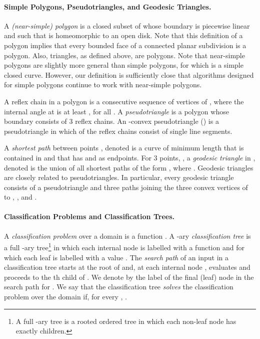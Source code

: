 \documentclass[lotsofwhite]{patmorin}
\begin{document}
\paragraph{Simple Polygons, Pseudotriangles, and Geodesic Triangles.}

A \emph{(near-simple) polygon}  is a closed subset of  whose
boundary is piecewise linear and such that  is
homeomorphic to an open disk.  Note that this definition of a polygon
implies that every bounded face of a connected planar subdivision is a
polygon.  Also, triangles, as defined above, are polygons.  Note that
near-simple polygons are slightly more general than simple polygons,
for which  is a simple closed curve.  However, our
definition is sufficiently close that algorithms designed for simple
polygons continue to work with near-simple polygons.

A reflex chain in a polygon  is a consecutive sequence of vertices
 of , where the internal angle at  is at least
, for all . A \emph{pseudotriangle} is a
polygon whose boundary consists of 3 reflex chains.  An -convex
pseudotriangle () is a pseudotriangle in which  of
the reflex chains consist of single line segments.

A \emph{shortest path} between points , denoted
 is a curve of minimum length that is contained in
 and that has  and  as endpoints.  For 3 points, , a \emph{geodesic triangle} in , denoted  is
the union of all shortest paths of the form , where
.  Geodesic triangles are closely related to
pseudotriangles.  In particular, every geodesic triangle  consists
of a pseudotriangle  and three paths joining the three convex
vertices of  to , , and .

\paragraph{Classification Problems and Classification Trees.}

A \emph{classification problem} over a domain  is a
function .  A
-ary \emph{classification tree} is a full -ary tree\footnote{A
full -ary tree is a rooted ordered tree in which each non-leaf node
has exactly  children.} in which each internal node  is labelled
with a function  and for
which each leaf  is labelled with a value
. The \emph{search path} of an input 
in a classification tree  starts at the root of  and, at each
internal node , evaluates  and proceeds to the th
child of .  We denote by  the label of the final (leaf) node
in the search path for .  We say that the classification tree 
\emph{solves} the classification problem  over the domain
 if, for every , .
\end{document}
